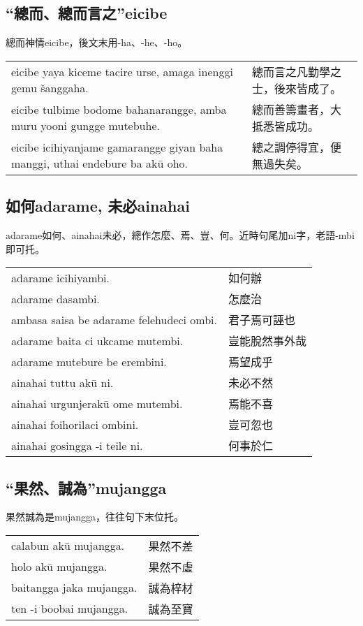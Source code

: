 \documentclass{article}
\begin{document}
\subsection{“總而、總而言之”eicibe}
\noindent 總而神情eicibe，後文末用-ha、-he、-ho。
\begin{center}
    \begin{tabularx}{\textwidth}{XX}
        eicibe yaya kiceme tacire urse, amaga inenggi gemu \v{s}anggaha. & 總而言之凡勤學之士，後來皆成了。\\
        eicibe tulbime bodome bahanarangge, amba muru yooni gungge mutebuhe. & 總而善籌畫者，大抵悉皆成功。\\
        eicibe icihiyanjame gamarangge giyan baha manggi, uthai endebure ba ak\={u} oho. & 總之調停得宜，便無過失矣。
    \end{tabularx}
\end{center}

\subsection{如何adarame, 未必ainahai}
\noindent adarame如何、ainahai未必，總作怎麼、焉、豈、何。近時句尾加ni字，老語-mbi即可托。
\begin{center}
    \begin{tabularx}{\textwidth}{XX}
        adarame icihiyambi. & 如何辦\\
        adarame dasambi. & 怎麼治\\
        ambasa saisa be adarame felehudeci ombi. & 君子焉可誣也\\
        adarame baita ci ukcame mutembi. & 豈能脫然事外哉\\
        adarame mutebure be erembini. & 焉望成乎\\
        ainahai tuttu ak\={u} ni. & 未必不然\\
        ainahai urgunjerak\={u} ome mutembi. & 焉能不喜\\
        ainahai foihorilaci ombini. & 豈可忽也\\
        ainahai gosingga -i teile ni. & 何事於仁
    \end{tabularx}
\end{center}

\subsection{“果然、誠為”mujangga}
\noindent 果然誠為是mujangga，往往句下末位托。
\begin{center}
    \begin{tabularx}{\textwidth}{XX}
        calabun ak\={u} mujangga. & 果然不差\\
        holo ak\={u} mujangga. & 果然不虛\\
        baitangga jaka mujangga. & 誠為梓材\\
        ten -i boobai mujangga. & 誠為至寶
    \end{tabularx}
\end{center}
\end{document}
